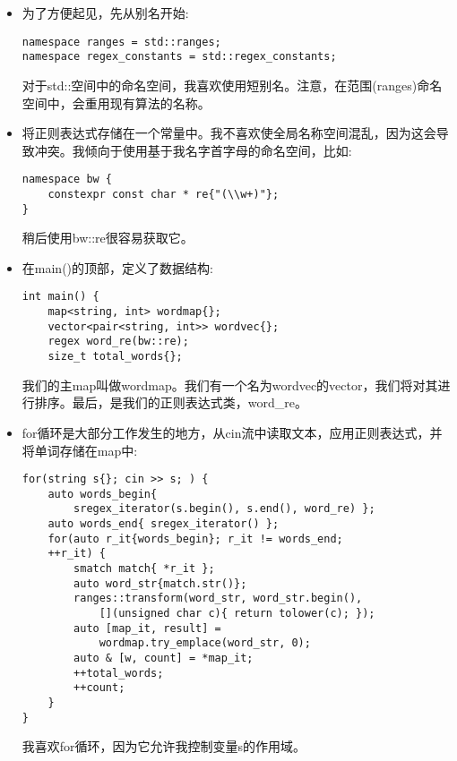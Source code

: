 \begin{itemize}
\item 
为了方便起见，先从别名开始:

\begin{lstlisting}[style=styleCXX]
namespace ranges = std::ranges;
namespace regex_constants = std::regex_constants;
\end{lstlisting}

对于std::空间中的命名空间，我喜欢使用短别名。注意，在范围(ranges)命名空间中，会重用现有算法的名称。

\item 
将正则表达式存储在一个常量中。我不喜欢使全局名称空间混乱，因为这会导致冲突。我倾向于使用基于我名字首字母的命名空间，比如:

\begin{lstlisting}[style=styleCXX]
namespace bw {
	constexpr const char * re{"(\\w+)"};
}
\end{lstlisting}

稍后使用bw::re很容易获取它。

\item 
在main()的顶部，定义了数据结构:

\begin{lstlisting}[style=styleCXX]
int main() {
	map<string, int> wordmap{};
	vector<pair<string, int>> wordvec{};
	regex word_re(bw::re);
	size_t total_words{};
\end{lstlisting}

我们的主map叫做wordmap。我们有一个名为wordvec的vector，我们将对其进行排序。最后，是我们的正则表达式类，word\_re。

\item 
for循环是大部分工作发生的地方，从cin流中读取文本，应用正则表达式，并将单词存储在map中:

\begin{lstlisting}[style=styleCXX]
for(string s{}; cin >> s; ) {
	auto words_begin{
		sregex_iterator(s.begin(), s.end(), word_re) };
	auto words_end{ sregex_iterator() };
	for(auto r_it{words_begin}; r_it != words_end;
	++r_it) {
		smatch match{ *r_it };
		auto word_str{match.str()};
		ranges::transform(word_str, word_str.begin(),
			[](unsigned char c){ return tolower(c); });
		auto [map_it, result] =
			wordmap.try_emplace(word_str, 0);
		auto & [w, count] = *map_it;
		++total_words;
		++count;
	}
}
\end{lstlisting}

我喜欢for循环，因为它允许我控制变量s的作用域。


\end{itemize}

